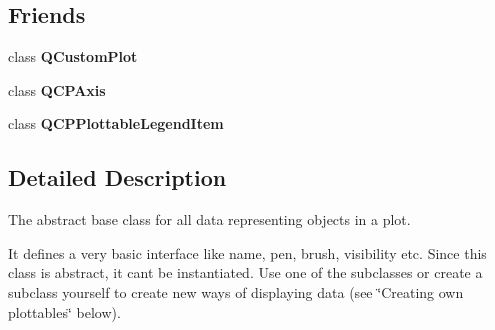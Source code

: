 \subsection*{Friends}
\begin{DoxyCompactItemize}
\item 
\hypertarget{class_q_c_p_abstract_plottable_a1cdf9df76adcfae45261690aa0ca2198}{}\label{class_q_c_p_abstract_plottable_a1cdf9df76adcfae45261690aa0ca2198} 
class {\bfseries Q\+Custom\+Plot}
\item 
\hypertarget{class_q_c_p_abstract_plottable_af123edeca169ec7a31958a1d714e1a8a}{}\label{class_q_c_p_abstract_plottable_af123edeca169ec7a31958a1d714e1a8a} 
class {\bfseries Q\+C\+P\+Axis}
\item 
\hypertarget{class_q_c_p_abstract_plottable_a104c78e91302afd6842a903e472f552f}{}\label{class_q_c_p_abstract_plottable_a104c78e91302afd6842a903e472f552f} 
class {\bfseries Q\+C\+P\+Plottable\+Legend\+Item}
\end{DoxyCompactItemize}


\subsection{Detailed Description}
The abstract base class for all data representing objects in a plot. 

It defines a very basic interface like name, pen, brush, visibility etc. Since this class is abstract, it can\textquotesingle{}t be instantiated. Use one of the subclasses or create a subclass yourself to create new ways of displaying data (see \char`\"{}\+Creating own plottables\char`\"{} below).

